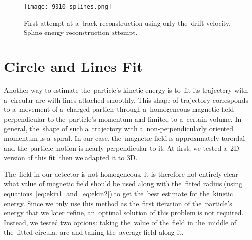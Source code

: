		\begin{figure}
			\centering
			\texttt{[image: 9010\_splines.png]}
			\caption{First attempt at a~track reconstruction using only the~drift velocity. Spline energy reconstruction attempt.}
			\label{fig:9010splines}
		\end{figure}
	
	\section{Circle and Lines Fit}
	\label{sec:clines}
		Another way to estimate the~particle's kinetic energy is to~fit its trajectory with a~circular arc with lines attached smoothly. This shape of trajectory corresponds to a~movement of a~charged particle through a~homogeneous magnetic field perpendicular to the~particle's momentum and limited to a~certain volume. In general, the~shape of such a~trajectory with a~non-perpendicularly oriented momentum is a~spiral. In our case, the~magnetic field is approximately toroidal and the~particle motion is nearly perpendicular to it. At first, we tested a~2D version of this fit, then we adapted it to 3D.
		
		The~field in our detector is not homogeneous, it is therefore not entirely clear what value of magnetic field should be used along with the~fitted radius (using equations~\ref{eq:ekin1} and~\ref{eq:ekin2}) to get the~best estimate for the~kinetic energy. Since we only use this method as the~first iteration of the~particle's energy that we later refine, an~optimal solution of this problem is not required. Instead, we tested two options: taking the~value of the~field in the~middle of the~fitted circular arc and taking the~average field along it.
		
